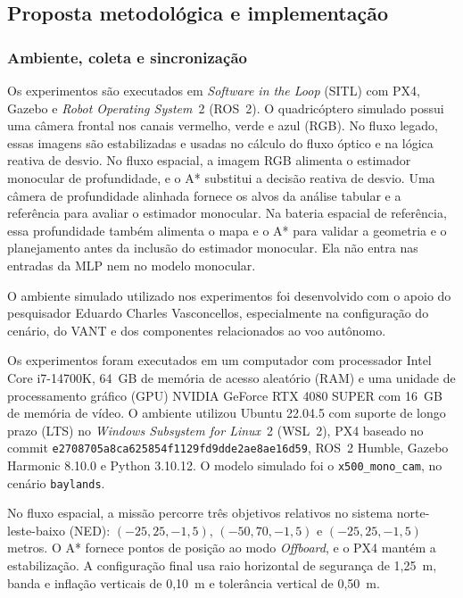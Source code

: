 \documentclass[article,a4paper,12pt,brazil,sumario=tradicional]{abntex2}
\begin{document}
\subsection{Proposta metodológica e implementação}

\subsubsection{Ambiente, coleta e sincronização}

Os experimentos são executados em \textit{Software in the Loop} (SITL) com PX4, Gazebo e \textit{Robot Operating System}~2 (ROS~2). O quadricóptero simulado possui uma câmera frontal nos canais vermelho, verde e azul (RGB). No fluxo legado, essas imagens são estabilizadas e usadas no cálculo do fluxo óptico e na lógica reativa de desvio. No fluxo espacial, a imagem RGB alimenta o estimador monocular de profundidade, e o A* substitui a decisão reativa de desvio. Uma câmera de profundidade alinhada fornece os alvos da análise tabular e a referência para avaliar o estimador monocular. Na bateria espacial de referência, essa profundidade também alimenta o mapa e o A* para validar a geometria e o planejamento antes da inclusão do estimador monocular. Ela não entra nas entradas da MLP nem no modelo monocular.

O ambiente simulado utilizado nos experimentos foi desenvolvido com o apoio do pesquisador Eduardo Charles Vasconcellos, especialmente na configuração do cenário, do VANT e dos componentes relacionados ao voo autônomo.

Os experimentos foram executados em um computador com processador Intel Core i7-14700K, 64~GB de memória de acesso aleatório (RAM) e uma unidade de processamento gráfico (GPU) NVIDIA GeForce RTX 4080 SUPER com 16~GB de memória de vídeo. O ambiente utilizou Ubuntu 22.04.5 com suporte de longo prazo (LTS) no \textit{Windows Subsystem for Linux}~2 (WSL~2), PX4 baseado no commit \texttt{e2708705a8ca625854f1129fd9dde2ae8ae16d59}, ROS~2 Humble, Gazebo Harmonic 8.10.0 e Python 3.10.12. O modelo simulado foi o \texttt{x500\_mono\_cam}, no cenário \texttt{baylands}.

No fluxo espacial, a missão percorre três objetivos relativos no sistema norte-leste-baixo (NED): $(-25,25,-1{,}5)$, $(-50,70,-1{,}5)$ e $(-25,25,-1{,}5)$ metros. O A* fornece pontos de posição ao modo \textit{Offboard}, e o PX4 mantém a estabilização. A configuração final usa raio horizontal de segurança de 1,25~m, banda e inflação verticais de 0,10~m e tolerância vertical de 0,50~m.
\end{document}
